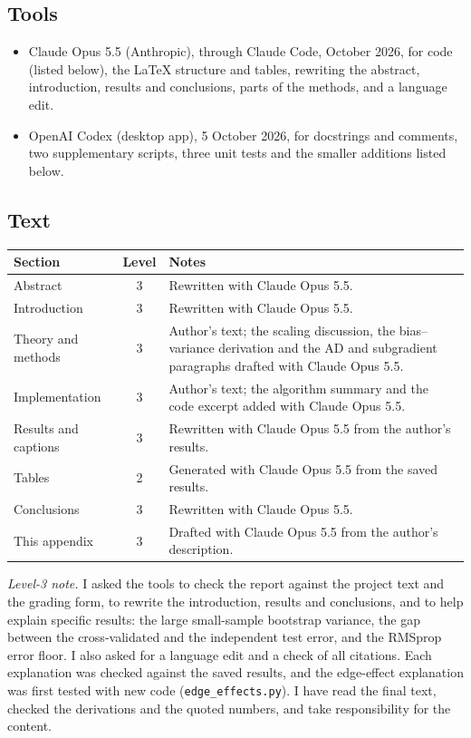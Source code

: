 \documentclass[aps,prb,reprint,superscriptaddress,nofootinbib,longbibliography,floatfix]{revtex4-2}
\begin{document}
\subsection{Tools}
\begin{itemize}
\item Claude Opus 5.5 (Anthropic), through Claude Code, October 2026, for code (listed below), the LaTeX structure and tables, rewriting the abstract, introduction, results and conclusions, parts of the methods, and a language edit.
\item OpenAI Codex (desktop app), 5 October 2026, for docstrings and comments, two supplementary scripts, three unit tests and the smaller additions listed below.
\end{itemize}

\subsection{Text}
{\small
\noindent\begin{tabular}{@{}p{}cp{}@{}}
\hline
Section & Level & Notes\\ \hline
Abstract & 3 & Rewritten with Claude Opus 5.5.\\
Introduction & 3 & Rewritten with Claude Opus 5.5.\\
Theory and methods & 3 & Author's text; the scaling discussion, the bias--variance derivation and the AD and subgradient paragraphs drafted with Claude Opus 5.5.\\
Implementation & 3 & Author's text; the algorithm summary and the code excerpt added with Claude Opus 5.5.\\
Results and captions & 3 & Rewritten with Claude Opus 5.5 from the author's results.\\
Tables & 2 & Generated with Claude Opus 5.5 from the saved results.\\
Conclusions & 3 & Rewritten with Claude Opus 5.5.\\
This appendix & 3 & Drafted with Claude Opus 5.5 from the author's description.\\
\hline
\end{tabular}}

\emph{Level-3 note.} I asked the tools to check the report against the project text and the grading form, to rewrite the introduction, results and conclusions, and to help explain specific results: the large small-sample bootstrap variance, the gap between the cross-validated and the independent test error, and the RMSprop error floor. I also asked for a language edit and a check of all citations. Each explanation was checked against the saved results, and the edge-effect explanation was first tested with new code (\texttt{edge\_effects.py}). I have read the final text, checked the derivations and the quoted numbers, and take responsibility for the content.
\end{document}
